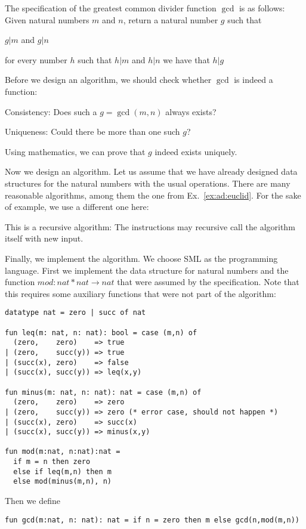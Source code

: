 \begin{example}\label{ex:ad:euclid2}
The specification of the greatest common divider function $\gcd$ is as follows:
Given natural numbers $m$ and $n$, return a natural number $g$ such that
\begin{compactitem}
\item $g|m$ and $g|n$
\item for every number $h$ such that $h|m$ and $h|n$ we have that $h|g$
\end{compactitem}
\medskip

Before we design an algorithm, we should check whether $\gcd$ is indeed a function:
\begin{compactitem}
  \item Consistency: Does such a $g=\gcd(m,n)$ always exists?
  \item Uniqueness: Could there be more than one such $g$?
\end{compactitem}
Using mathematics, we can prove that $g$ indeed exists uniquely.
\medskip

Now we design an algorithm.
Let us assume that we have already designed data structures for the natural numbers with the usual operations.
There are many reasonable algorithms, among them the one from Ex.~\ref{ex:ad:euclid}.
For the sake of example, we use a different one here:
\medskip

\begin{acode}
\end{acode}

\medskip
This is a recursive algorithm: The instructions may recursive call the algorithm itself with new input.
\medskip

Finally, we implement the algorithm.
We choose SML as the programming language.
First we implement the data structure for natural numbers and the function $mod:nat*nat \to nat$ that were assumed by the specification.
Note that this requires some auxiliary functions that were not part of the algorithm:
\begin{lstlisting}
datatype nat = zero | succ of nat

fun leq(m: nat, n: nat): bool = case (m,n) of
  (zero,    zero)    => true
| (zero,    succ(y)) => true
| (succ(x), zero)    => false
| (succ(x), succ(y)) => leq(x,y)

fun minus(m: nat, n: nat): nat = case (m,n) of
  (zero,    zero)    => zero
| (zero,    succ(y)) => zero (* error case, should not happen *)
| (succ(x), zero)    => succ(x)
| (succ(x), succ(y)) => minus(x,y)
  
fun mod(m:nat, n:nat):nat =
  if m = n then zero
  else if leq(m,n) then m
  else mod(minus(m,n), n)
\end{lstlisting}
 
Then we define
\begin{lstlisting}
fun gcd(m:nat, n: nat): nat = if n = zero then m else gcd(n,mod(m,n))
\end{lstlisting}
\end{example}

